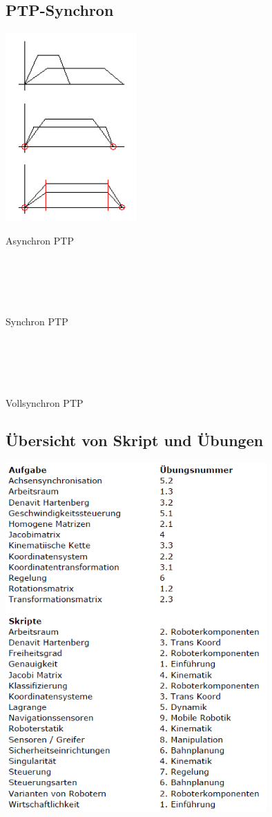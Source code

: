 	\subsection{PTP-Synchron}
	\begin{minipage}{6cm}
		\includegraphics[width=5cm]{./bilder/synchron.png}
    \end{minipage}
	\begin{minipage}{12.5cm}
    	Asynchron PTP\\ \\ \\ \\ \\ \\
    	Synchron PTP\\ \\ \\ \\ \\ \\
    	Vollsynchron PTP\\
    \end{minipage}

	\subsection{Übersicht von Skript und Übungen}
	\includegraphics[width=10cm]{./bilder/uebersicht.png}



  

	

